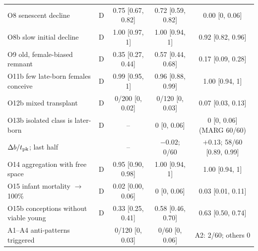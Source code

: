 \begin{table}[t]
{\begin{tabular}{@{}llccc@{}}
    \midrule
    O8 senescent decline & D & 0.75 [0.67, 0.82] & 0.72 [0.59, 0.82] & 0.00 [0, 0.06] \\
    O8b slow initial decline & D & 1.00 [0.97, 1] & 1.00 [0.94, 1] & 0.92 [0.82, 0.96] \\
    O9 old, female-biased remnant & D & 0.35 [0.27, 0.44] & 0.57 [0.44, 0.68] & 0.17 [0.09, 0.28] \\
    O11b few late-born females conceive & D & 0.99 [0.95, 1] & 0.96 [0.88, 0.99] & 1.00 [0.94, 1] \\
    O12b mixed transplant & D & 0/200 [0, 0.02] & 0/120 [0, 0.03] & 0.07 [0.03, 0.13] \\
    O13b isolated class is later-born & D & -- & 0 [0, 0.06] & 0 [0, 0.06] (MARG 60/60) \\
    \quad $\Delta b/t_{\rm pk}$; last half & & -- & $-0.02$; 0/60 & $+0.13$; 58/60 [0.89, 0.99] \\
    O14 aggregation with free space & D & 0.95 [0.90, 0.98] & 1.00 [0.94, 1] & 1.00 [0.94, 1] \\
    O15 infant mortality $\to$ 100\% & D & 0.02 [0.00, 0.06] & 0 [0, 0.06] & 0.03 [0.01, 0.11] \\
    O15b conceptions without viable young & D & 0.33 [0.25, 0.41] & 0.58 [0.46, 0.70] & 0.63 [0.50, 0.74] \\
    \midrule
    A1--A4 anti-patterns triggered & & 0/120 [0, 0.03] & 0/60 [0, 0.06] & A2: 2/60; others 0 \\
    \bottomrule
  \end{tabular}}
\end{table}

